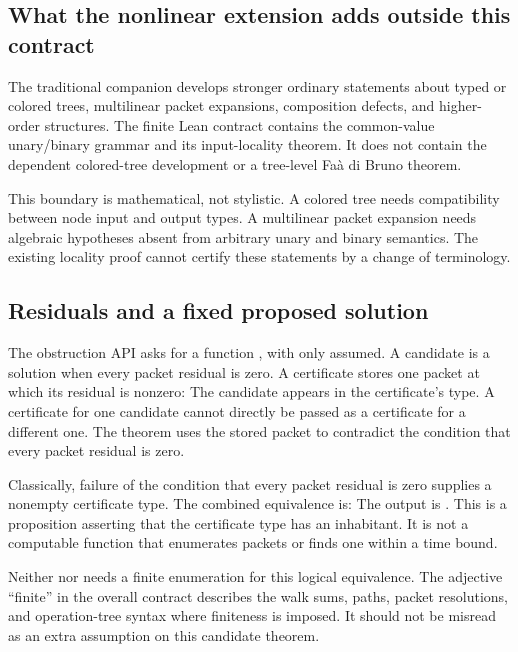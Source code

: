 \subsection{What the nonlinear extension adds outside this contract}
The traditional companion develops stronger ordinary statements about typed or colored trees, multilinear packet expansions, composition defects, and higher-order structures. The finite Lean contract contains the common-value unary/binary grammar and its input-locality theorem. It does not contain the dependent colored-tree development or a tree-level Faà di Bruno theorem.

This boundary is mathematical, not stylistic. A colored tree needs compatibility between node input and output types. A multilinear packet expansion needs algebraic hypotheses absent from arbitrary unary and binary semantics. The existing locality proof cannot certify these statements by a change of terminology.

\subsection{Residuals and a fixed proposed solution}
The obstruction API asks for a function
, with only  assumed. A candidate is a solution when every packet residual is zero. A certificate stores one packet at which its residual is nonzero:
The candidate appears in the certificate's type. A certificate for one candidate cannot directly be passed as a certificate for a different one. The theorem  uses the stored packet to contradict the condition that every packet residual is zero.

Classically, failure of the condition that every packet residual is zero supplies a nonempty certificate type. The combined equivalence is:
The output is . This is a proposition asserting that the certificate type has an inhabitant. It is not a computable function that enumerates packets or finds one within a time bound.

Neither  nor  needs a finite enumeration for this logical equivalence. The adjective ``finite'' in the overall contract describes the walk sums, paths, packet resolutions, and operation-tree syntax where finiteness is imposed. It should not be misread as an extra  assumption on this candidate theorem.

